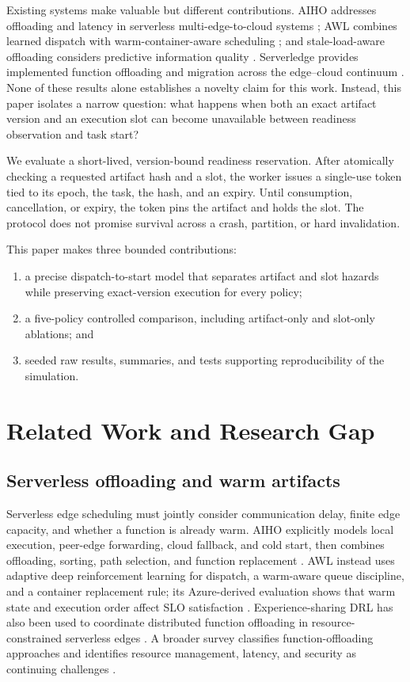 \documentclass[conference]{IEEEtran}
\begin{document}
Existing systems make valuable but different contributions. AIHO addresses offloading and latency in serverless multi-edge-to-cloud systems \cite{li2025aiho}; AWL combines learned dispatch with warm-container-aware scheduling \cite{li2025awl}; and stale-load-aware offloading considers predictive information quality \cite{hamid2026staleness}. Serverledge provides implemented function offloading and migration across the edge--cloud continuum \cite{russo2024framework}. None of these results alone establishes a novelty claim for this work. Instead, this paper isolates a narrow question: what happens when both an exact artifact version and an execution slot can become unavailable between readiness observation and task start?

We evaluate a short-lived, version-bound readiness reservation. After atomically checking a requested artifact hash and a slot, the worker issues a single-use token tied to its epoch, the task, the hash, and an expiry. Until consumption, cancellation, or expiry, the token pins the artifact and holds the slot. The protocol does not promise survival across a crash, partition, or hard invalidation.

This paper makes three bounded contributions:
\begin{enumerate}
\item a precise dispatch-to-start model that separates artifact and slot hazards while preserving exact-version execution for every policy;
\item a five-policy controlled comparison, including artifact-only and slot-only ablations; and
\item seeded raw results, summaries, and tests supporting reproducibility of the simulation.
\end{enumerate}

\section{Related Work and Research Gap}

\subsection{Serverless offloading and warm artifacts}

Serverless edge scheduling must jointly consider communication delay, finite edge capacity, and whether a function is already warm. AIHO explicitly models local execution, peer-edge forwarding, cloud fallback, and cold start, then combines offloading, sorting, path selection, and function replacement \cite{li2025aiho}. AWL instead uses adaptive deep reinforcement learning for dispatch, a warm-aware queue discipline, and a container replacement rule; its Azure-derived evaluation shows that warm state and execution order affect SLO satisfaction \cite{li2025awl}. Experience-sharing DRL has also been used to coordinate distributed function offloading in resource-constrained serverless edges \cite{liu2023esdrl}. A broader survey classifies function-offloading approaches and identifies resource management, latency, and security as continuing challenges \cite{survey2024offloading}.
\end{document}
